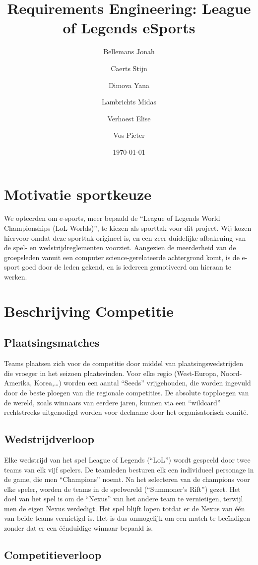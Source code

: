 \documentclass[12pt,a4paper]{article}
\title{Requirements Engineering: League of Legends eSports}
\author{Bellemans Jonah \and Caerts Stijn \and Dimova Yana \and Lambrichts Midas \and Verhoest Elise \and Vos Pieter}
\date{\today}
\begin{document}
	\maketitle
	\newpage
	\tableofcontents
	\newpage
	\section{Motivatie sportkeuze}
		We opteerden om e-sports, meer bepaald de ``League of Legends World Championships (LoL Worlds)'', te kiezen als sporttak voor dit project. Wij kozen hiervoor omdat deze sporttak origineel is, en een zeer duidelijke afbakening van de spel- en wedstrijdreglementen voorziet. Aangezien de meerderheid van de groepsleden vanuit een computer science-gerelateerde achtergrond komt, is de e-sport goed door de leden gekend, en is iedereen gemotiveerd om hieraan te werken.
	\section{Beschrijving Competitie}
		\subsection{Plaatsingsmatches}
			Teams plaatsen zich voor de competitie door middel van plaatsingswedstrijden die vroeger in het seizoen plaatsvinden. Voor elke regio (West-Europa, Noord-Amerika, Korea,\dots) worden een aantal ``Seeds'' vrijgehouden, die worden ingevuld door de beste ploegen van die regionale competities. De absolute topploegen van de wereld, zoals winnaars van eerdere jaren, kunnen via een ``wildcard'' rechtstreeks uitgenodigd worden voor deelname door het organisatorisch comité.
		\subsection{Wedstrijdverloop}
			Elke wedstrijd van het spel League of Legends (``LoL'') wordt gespeeld door twee teams van elk vijf spelers. De teamleden besturen elk een individueel personage in de game, die men ``Champions'' noemt. Na het selecteren van de champions voor elke speler, worden de teams in de spelwereld (``Summoner's Rift'') gezet. Het doel van het spel is om de ``Nexus'' van het andere team te vernietigen, terwijl men de eigen Nexus verdedigt. Het spel blijft lopen totdat er de Nexus van één van beide teams vernietigd is. Het is dus onmogelijk om een match te beeïndigen zonder dat er een éénduidige winnaar bepaald is.
		\subsection{Competitieverloop}
\end{document}
